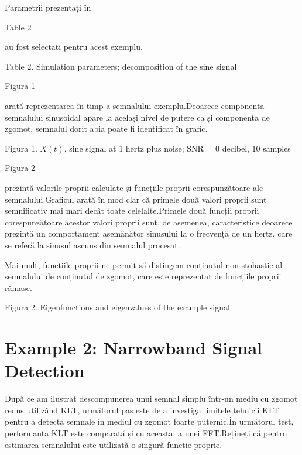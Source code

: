 \documentclass[12pt]{report}
\begin{document}
Parametrii prezentați în \begin{normalsize}\color{red}Table 2\end{normalsize} au fost selectați pentru acest exemplu.
\begin{center}
	\color{blue}Table 2. Simulation parameters; decomposition of the sine signal
\end{center}
\begin{normalsize}\color{red}Figura 1\end{normalsize} arată reprezentarea în timp a semnalului exemplu.\@ Deoarece componenta semnalului sinusoidal apare la același nivel de putere ca și componenta de zgomot, semnalul dorit abia poate fi identificat în grafic.
\begin{center}
	\color{blue}Figura 1. $X(t)$, sine signal at 1 hertz plus noise; SNR = 0 decibel, 10 samples
\end{center}
\begin{normalsize}\color{red}Figura 2\end{normalsize} prezintă valorile proprii calculate și funcțiile proprii corespunzătoare ale semnalului.\@ Graficul arată în mod clar că primele două valori proprii sunt semnificativ mai mari decât toate celelalte.\@ Primele două funcții proprii corespunzătoare acestor valori proprii sunt, de asemenea, caracteristice deoarece prezintă un comportament asemănător sinusului la o frecvență de un hertz, care se referă la sinusul ascuns din semnalul procesat.

Mai mult, funcțiile proprii ne permit să distingem conținutul non-stohastic al semnalului de conținutul de zgomot, care este reprezentat de funcțiile proprii rămase.
\begin{center}
	\color{blue}Figura 2. Eigenfunctions and eigenvalues of the example signal
\end{center}
\section*{Example 2: Narrowband Signal Detection}
După ce am ilustrat descompunerea unui semnal simplu într-un mediu cu zgomot redus utilizând KLT, următorul pas este de a investiga limitele tehnicii KLT pentru a detecta semnale în mediul cu zgomot foarte puternic.\@ În următorul test, performanța KLT este comparată și cu aceasta. a unei FFT.\@ Rețineți că pentru estimarea semnalului este utilizată o singură funcție proprie.
\end{document}
